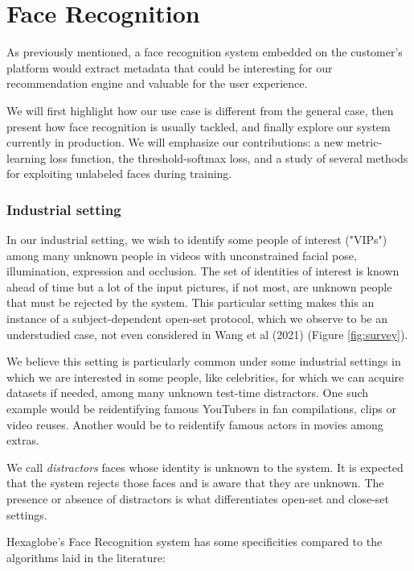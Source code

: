 \chapter{Face Recognition}
\label{sec:facerec}

As previously mentioned, a face recognition system embedded on the customer's platform would extract metadata that could be interesting for our recommendation engine and valuable for the user experience.

We will first highlight how our use case is different from the general case, then present how face recognition is usually tackled, and finally explore our system currently in production. We will emphasize our contributions: a new metric-learning loss function, the threshold-softmax loss, and a study of several methods for exploiting unlabeled faces during training.

\subsection{Industrial setting}

In our industrial setting, we wish to identify some people of interest ("VIPs") among many unknown people in videos with unconstrained facial pose, illumination, expression and occlusion. The set of identities of interest is known ahead of time but a lot of the input pictures, if not most, are unknown people that must be rejected by the system. This particular setting makes this an instance of a subject-dependent open-set protocol, which we observe to be an understudied case, not even considered in Wang et al (2021) \cite{survey} (Figure \ref{fig:survey}).

We believe this setting is particularly common under some industrial settings in which we are interested in some people, like celebrities, for which we can acquire datasets if needed, among many unknown test-time distractors. One such example would be reidentifying famous YouTubers in fan compilations, clips or video reuses. Another would be to reidentify famous actors in movies among extras.

We call \emph{distractors} faces whose identity is unknown to the system. It is expected that the system rejects those faces and is aware that they are unknown. The presence or absence of distractors is what differentiates open-set and close-set settings.

Hexaglobe's Face Recognition system has some specificities compared to the algorithms laid in the literature:

